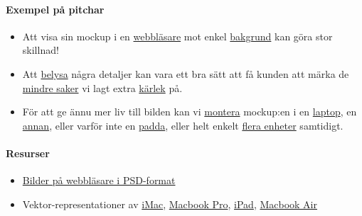 \documentclass{article}
\begin{document}
      \paragraph{Exempel på pitchar}
      \begin{itemize}
        \item
          Att visa sin mockup i en
          \href{http://netdna.webdesignerdepot.com/uploads/2013/07/browsermockup.jpg}{webbläsare}
          mot enkel
          \href{http://www.pixeden.com/media/k2/galleries/196/002-google-chrome-browser-navigator-web-psd.jpg}{bakgrund}
          kan göra stor skillnad!
        \item
          Att
          \href{http://freebiesbug.com/wp-content/uploads/2013/03/free-psd-safari-browser.jpg}{belysa}
          några detaljer kan vara ett bra sätt att få kunden att märka de
          \href{http://dribbble.com/shots/659616-Project-Planner-details?list=searches&tag=website_details}{mindre saker}
          vi lagt extra
          \href{http://dribbble.com/shots/311028-Donate?list=searches&tag=website_details}{kärlek}
          på.
        \item
          För att ge ännu mer liv till bilden kan vi
          \href{http://multimediabomb.com/preview/thumbs/hands-on-macbook-laptop-mockups-psd.jpg}{montera}
          mockup:en i en
          \href{http://dribbble.com/shots/1226683-Portfolio-Redesign-2k13?list=tags&tag=website}{laptop},
          en 
          \href{http://dribbble.com/shots/1226951-Minimal-Browser-Version?list=popular&offset=70}{annan},
          eller varför
          inte en
          \href{http://dribbble.com/shots/1224075-Central-Reach?list=tags&tag=website}{padda},
          eller helt enkelt
          \href{http://www.psdexplorer.com/wp-content/uploads/2012/09/free-psd-responsive_screen_mockup_pack.png}{flera enheter}
          samtidigt.
      \end{itemize}

      \paragraph{Resurser}
      \begin{itemize}
        \item
          \href{http://www.mohunky.com/content/public/v7/BrowserMock-upPSDs.aspx}{Bilder på webbläsare i PSD-format}
        \item
          Vektor-representationer av  
          \href{http://www.bestpsdfreebies.com/freebie/vectorized-imac/}{iMac}, 
          \href{http://www.bestpsdfreebies.com/freebie/vectorized-macbook-pro/}{Macbook Pro}, 
          \href{http://www.bestpsdfreebies.com/freebie/ipad-web-preview-mockup/}{iPad}, 
          \href{http://www.bestpsdfreebies.com/freebie/macbook-air/}{Macbook Air}
      \end{itemize}
\end{document}
